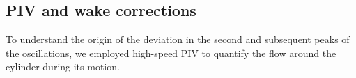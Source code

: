 \documentclass{jfm}
\begin{document}
{\subsection{PIV and wake corrections}
To understand the origin of the deviation in the second and subsequent peaks of the oscillations, we employed high-speed PIV to quantify the flow around the cylinder during its motion. 
%	
}
\end{document}
